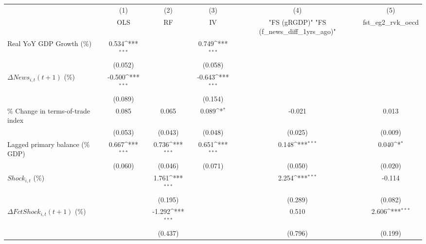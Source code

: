 {
\def\sym#1{\ifmmode^{#1}\else\(^{#1}\)\fi}
\begin{tabular}{l*{5}{c}}
\toprule
                    &\multicolumn{1}{c}{(1)}&\multicolumn{1}{c}{(2)}&\multicolumn{1}{c}{(3)}&\multicolumn{1}{c}{(4)}&\multicolumn{1}{c}{(5)}\\
                    &\multicolumn{1}{c}{OLS}&\multicolumn{1}{c}{RF}&\multicolumn{1}{c}{IV}&\multicolumn{1}{c}{ "FS (gRGDP)"  "FS (f_news_diff_1yrs_ago)" }&\multicolumn{1}{c}{fst_eg2_rvk_oecd}\\
\midrule
Real YoY GDP Growth (\%)&       0.534\sym{***}&                     &       0.749\sym{***}&                     &                     \\
                    &     (0.052)         &                     &     (0.058)         &                     &                     \\
\addlinespace
$ \Delta News_{i,t}(t+1)$ (\%)&      -0.500\sym{***}&                     &      -0.643\sym{***}&                     &                     \\
                    &     (0.089)         &                     &     (0.154)         &                     &                     \\
\addlinespace
\% Change in terms-of-trade index&       0.085         &       0.065         &       0.089\sym{*}  &      -0.021         &       0.013         \\
                    &     (0.053)         &     (0.043)         &     (0.048)         &     (0.025)         &     (0.009)         \\
\addlinespace
Lagged primary balance (\% GDP)&       0.667\sym{***}&       0.736\sym{***}&       0.651\sym{***}&       0.148\sym{***}&       0.040\sym{*}  \\
                    &     (0.060)         &     (0.046)         &     (0.071)         &     (0.050)         &     (0.020)         \\
\addlinespace
$ Shock_{i,t}$ (\%) &                     &       1.761\sym{***}&                     &       2.254\sym{***}&      -0.114         \\
                    &                     &     (0.195)         &                     &     (0.289)         &     (0.082)         \\
\addlinespace
$ \Delta FctShock_{i,t}(t+1)$ (\%)&                     &      -1.292\sym{***}&                     &       0.510         &       2.606\sym{***}\\
                    &                     &     (0.437)         &                     &     (0.796)         &     (0.199)         \\

\end{tabular}}
